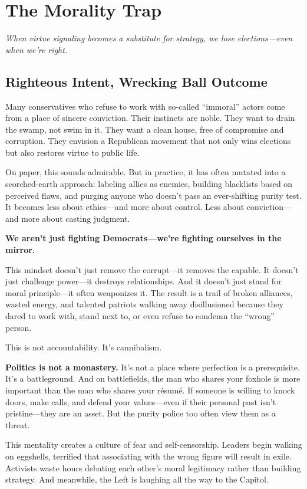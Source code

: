 \chapter{The Morality Trap}
\textit{When virtue signaling becomes a substitute for strategy, we lose elections—even when we’re right.}

\section{Righteous Intent, Wrecking Ball Outcome}
Many conservatives who refuse to work with so-called ``immoral'' actors come from a place of sincere conviction. Their instincts are noble. They want to drain the swamp, not swim in it. They want a clean house, free of compromise and corruption. They envision a Republican movement that not only wins elections but also restores virtue to public life. 

On paper, this sounds admirable. But in practice, it has often mutated into a scorched-earth approach: labeling allies as enemies, building blacklists based on perceived flaws, and purging anyone who doesn’t pass an ever-shifting purity test. It becomes less about ethics—and more about control. Less about conviction—and more about casting judgment.

\textbf{We aren’t just fighting Democrats—we’re fighting ourselves in the mirror.}

This mindset doesn’t just remove the corrupt—it removes the capable. It doesn’t just challenge power—it destroys relationships. And it doesn’t just stand for moral principle—it often weaponizes it. The result is a trail of broken alliances, wasted energy, and talented patriots walking away disillusioned because they dared to work with, stand next to, or even refuse to condemn the “wrong” person.

This is not accountability. It’s cannibalism.

\textbf{Politics is not a monastery.} It’s not a place where perfection is a prerequisite. It’s a battleground. And on battlefields, the man who shares your foxhole is more important than the man who shares your résumé. If someone is willing to knock doors, make calls, and defend your values—even if their personal past isn’t pristine—they are an asset. But the purity police too often view them as a threat.

This mentality creates a culture of fear and self-censorship. Leaders begin walking on eggshells, terrified that associating with the wrong figure will result in exile. Activists waste hours debating each other's moral legitimacy rather than building strategy. And meanwhile, the Left is laughing all the way to the Capitol.

